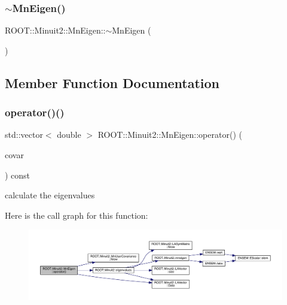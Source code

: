 \subsubsection{\texorpdfstring{$\sim$MnEigen()}{~MnEigen()}\hspace{0.1cm}{\footnotesize\ttfamily [3/3]}}
{\footnotesize\ttfamily R\+O\+O\+T\+::\+Minuit2\+::\+Mn\+Eigen\+::$\sim$\+Mn\+Eigen (\begin{DoxyParamCaption}{ }\end{DoxyParamCaption})\hspace{0.3cm}{\ttfamily [inline]}}



\subsection{Member Function Documentation}
\mbox{\label{classROOT_1_1Minuit2_1_1MnEigen_aba6999f348c2cbc8055528faf207b7d6}} 
\subsubsection{\texorpdfstring{operator()()}{operator()()}\hspace{0.1cm}{\footnotesize\ttfamily [1/3]}}
{\footnotesize\ttfamily std\+::vector$<$ double $>$ R\+O\+O\+T\+::\+Minuit2\+::\+Mn\+Eigen\+::operator() (\begin{DoxyParamCaption}\item[{const \mbox{\hyperlink{classROOT_1_1Minuit2_1_1MnUserCovariance}{Mn\+User\+Covariance}} \&}]{covar }\end{DoxyParamCaption}) const}



calculate the eigenvalues 

Here is the call graph for this function\+:
\nopagebreak
\begin{figure}[H]
\begin{center}
\leavevmode
\includegraphics[width=350pt]{d8/dce/classROOT_1_1Minuit2_1_1MnEigen_aba6999f348c2cbc8055528faf207b7d6_cgraph}
\end{center}
\end{figure}
\mbox{\label{classROOT_1_1Minuit2_1_1MnEigen_aba021c8f81549aae00ad600c3d3c2f93}} 
